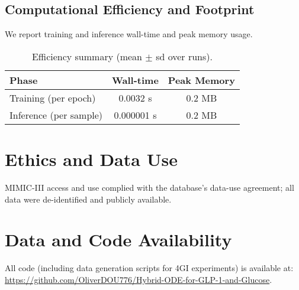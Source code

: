 \documentclass[9pt,shortpaper,twoside,web]{ieeecolor}
\begin{document}
\subsection{Computational Efficiency and Footprint}\label{subsec:efficiency}
We report training and inference wall-time and peak memory usage.
\begin{table}[h]
\centering
\caption{Efficiency summary (mean $\pm$ sd over runs).}
\label{tab:efficiency}
\begin{tabular}{lcc}
\toprule
Phase & Wall-time & Peak Memory \\
\midrule
Training (per epoch) & 0.0032 s & 0.2 MB \\
Inference (per sample) & 0.000001 s & 0.2 MB \\
\bottomrule
\end{tabular}
\end{table}
\section*{Ethics and Data Use}
MIMIC-III access and use complied with the database’s data-use agreement; all data were de-identified and publicly available.
\section*{Data and Code Availability}
All code (including data generation scripts for 4GI experiments) is available at: \url{https://github.com/OliverDOU776/Hybrid-ODE-for-GLP-1-and-Glucose}.
\end{document}
